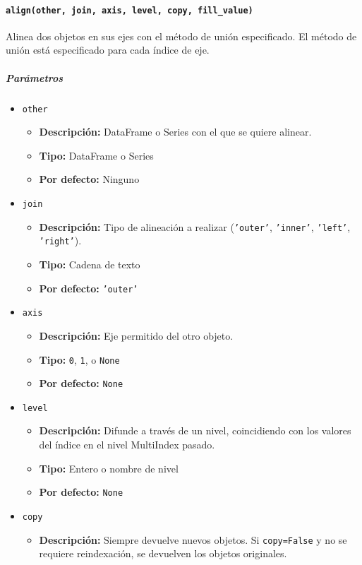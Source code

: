 \paragraph{\texttt{align(other, join, axis, level, copy, fill\_value)}}
Alinea dos objetos en sus ejes con el método de unión especificado. El método de unión está especificado para cada índice de eje.
\subparagraph{\textbf{Parámetros}}
\begin{itemize}
\item \texttt{other}
\begin{itemize}
\item \textbf{Descripción:} DataFrame o Series con el que se quiere alinear.
\item \textbf{Tipo:} DataFrame o Series
\item \textbf{Por defecto:} Ninguno
\end{itemize}
\item \texttt{join}
\begin{itemize}
\item \textbf{Descripción:} Tipo de alineación a realizar (\texttt{'outer'}, \texttt{'inner'}, \texttt{'left'}, \texttt{'right'}).
\item \textbf{Tipo:} Cadena de texto
\item \textbf{Por defecto:} \texttt{'outer'}
\end{itemize}
\item \texttt{axis}
\begin{itemize}
\item \textbf{Descripción:} Eje permitido del otro objeto.
\item \textbf{Tipo:} \texttt{0}, \texttt{1}, o \texttt{None}
\item \textbf{Por defecto:} \texttt{None}
\end{itemize}
\item \texttt{level}
\begin{itemize}
\item \textbf{Descripción:} Difunde a través de un nivel, coincidiendo con los valores del índice en el nivel MultiIndex pasado.
\item \textbf{Tipo:} Entero o nombre de nivel
\item \textbf{Por defecto:} \texttt{None}
\end{itemize}
\item \texttt{copy}
\begin{itemize}
\item \textbf{Descripción:} Siempre devuelve nuevos objetos. Si \texttt{copy=False} y no se requiere reindexación, se devuelven los objetos originales.

\end{itemize}
\end{itemize}
